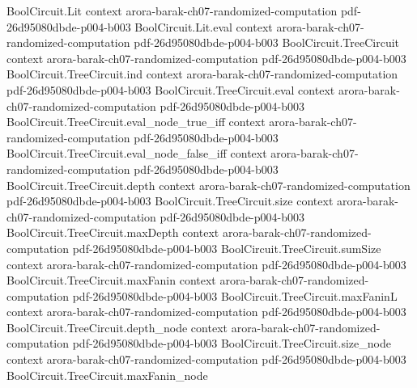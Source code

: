 \begin{theorem}
\label{Randomized.DTIME_subset_BPTIME}
\leanok
{}
\proofstep
  {BoolCircuit.Lit}
  {context}
  {arora-barak-ch07-randomized-computation}
  {pdf-26d95080dbde-p004-b003}
\proofstep
  {BoolCircuit.Lit.eval}
  {context}
  {arora-barak-ch07-randomized-computation}
  {pdf-26d95080dbde-p004-b003}
\proofstep
  {BoolCircuit.TreeCircuit}
  {context}
  {arora-barak-ch07-randomized-computation}
  {pdf-26d95080dbde-p004-b003}
\proofstep
  {BoolCircuit.TreeCircuit.ind}
  {context}
  {arora-barak-ch07-randomized-computation}
  {pdf-26d95080dbde-p004-b003}
\proofstep
  {BoolCircuit.TreeCircuit.eval}
  {context}
  {arora-barak-ch07-randomized-computation}
  {pdf-26d95080dbde-p004-b003}
\proofstep
  {BoolCircuit.TreeCircuit.eval_node_true_iff}
  {context}
  {arora-barak-ch07-randomized-computation}
  {pdf-26d95080dbde-p004-b003}
\proofstep
  {BoolCircuit.TreeCircuit.eval_node_false_iff}
  {context}
  {arora-barak-ch07-randomized-computation}
  {pdf-26d95080dbde-p004-b003}
\proofstep
  {BoolCircuit.TreeCircuit.depth}
  {context}
  {arora-barak-ch07-randomized-computation}
  {pdf-26d95080dbde-p004-b003}
\proofstep
  {BoolCircuit.TreeCircuit.size}
  {context}
  {arora-barak-ch07-randomized-computation}
  {pdf-26d95080dbde-p004-b003}
\proofstep
  {BoolCircuit.TreeCircuit.maxDepth}
  {context}
  {arora-barak-ch07-randomized-computation}
  {pdf-26d95080dbde-p004-b003}
\proofstep
  {BoolCircuit.TreeCircuit.sumSize}
  {context}
  {arora-barak-ch07-randomized-computation}
  {pdf-26d95080dbde-p004-b003}
\proofstep
  {BoolCircuit.TreeCircuit.maxFanin}
  {context}
  {arora-barak-ch07-randomized-computation}
  {pdf-26d95080dbde-p004-b003}
\proofstep
  {BoolCircuit.TreeCircuit.maxFaninL}
  {context}
  {arora-barak-ch07-randomized-computation}
  {pdf-26d95080dbde-p004-b003}
\proofstep
  {BoolCircuit.TreeCircuit.depth_node}
  {context}
  {arora-barak-ch07-randomized-computation}
  {pdf-26d95080dbde-p004-b003}
\proofstep
  {BoolCircuit.TreeCircuit.size_node}
  {context}
  {arora-barak-ch07-randomized-computation}
  {pdf-26d95080dbde-p004-b003}
\proofstep
  {BoolCircuit.TreeCircuit.maxFanin_node}

\end{theorem}
